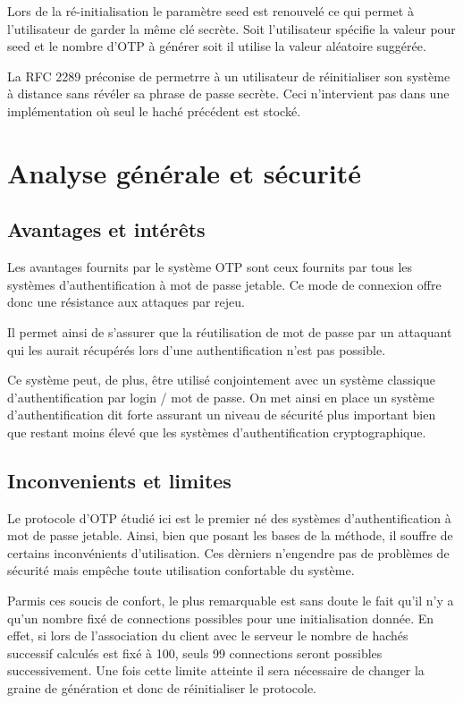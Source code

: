 \documentclass{../res/univ-projet}
\begin{document}
    Lors de la ré-initialisation le paramètre seed est renouvelé ce qui permet à
    l'utilisateur de garder la même clé secrète. Soit l'utilisateur spécifie la valeur
    pour seed et le nombre d'OTP à générer soit il utilise la valeur aléatoire suggérée.
    
    La RFC 2289 préconise de permetrre à un utilisateur de réinitialiser son système
    à distance sans révéler sa phrase de passe secrète. Ceci n'intervient pas dans
    une implémentation où seul le haché précédent est stocké.

\section{Analyse générale et sécurité}
    \subsection{Avantages et intér\^ets}
    Les avantages fournits par le système OTP sont ceux fournits par tous les
    systèmes d'authentification à mot de passe jetable. Ce mode de connexion 
    offre donc une résistance aux attaques par rejeu.
    
    Il permet ainsi de s'assurer que la réutilisation de mot de passe par un
    attaquant qui les aurait récupérés lors d'une authentification n'est pas 
    possible.
    
    Ce système peut, de plus, être utilisé conjointement avec un système 
    classique d'authentification par login / mot de passe. On met ainsi en 
    place un système d'authentification dit forte assurant un niveau de 
    sécurité plus important bien que restant moins élevé que les systèmes
    d'authentification cryptographique.
  
  \subsection{Inconvenients et limites}
  Le protocole d'OTP étudié ici est le premier né des systèmes 
  d'authentification à mot de passe jetable. Ainsi, bien que posant les bases
  de la méthode, il souffre de certains inconvénients d'utilisation. Ces 
  dèrniers n'engendre pas de problèmes de sécurité mais empêche toute 
  utilisation confortable du système.
  
  Parmis ces soucis de confort, le plus remarquable est sans doute le fait
  qu'il n'y a qu'un nombre fixé de connections possibles pour une 
  initialisation donnée. En effet, si lors de l'association du client avec 
  le serveur le nombre de hachés successif calculés est fixé à 100, seuls 
  99 connections seront possibles successivement. Une fois cette limite 
  atteinte il sera nécessaire de changer la graine de génération et donc
  de réinitialiser le protocole.
  
\end{document}
